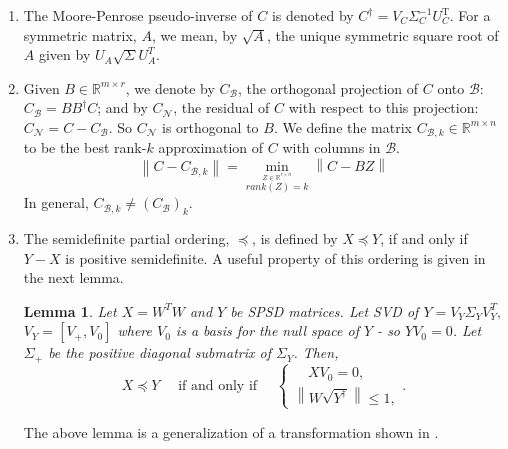 \documentclass[11pt]{article}
\newtheorem{lemma}[theorem]{Lemma}
\renewcommand{\math}[1]{$#1$}
\def\reals{\mathbb{R}}
\newcommand{\norm}[1]{\left\|#1\right\|}
\newcommand{\Leq}{\preceq}
\newcommand{\B}{\mathcal{B}}
\newcommand{\N}{\mathcal{N}}
\begin{document}
\begin{enumerate}
\item The Moore-Penrose pseudo-inverse of $C$ is denoted by $C^{\dagger} = V_C\Sigma_C^{-1}U_C^{\text{T}}$. For a symmetric matrix, $A$, we mean, by $\sqrt{A}$, the unique symmetric square root of $A$ given by $U_A \sqrt{\Sigma} U_A ^T$. 

\item Given $B \in \reals^{m \times r}$, we denote by $C_{\B}$, the orthogonal projection of $C$ onto $\B$: $C_{\B} = BB^{\dagger}C$; and by $C_{\N}$, the residual of $C$ with respect to this projection: $C_{\N} = C - C_{\B}$. So $C_{\N}$ is orthogonal to $B$. 
We define the matrix $C_{\B,k} \in \reals^{m \times n}$ to be the best rank-$k$ approximation of ${C}$ with columns in $\B$. 
\[\norm{C - C_{\B,k}} = \min_{\stackrel{Z \in \reals^{r \times n}}{rank(Z) = k}} \norm{C - BZ}\]
In general, $C_{\B,k} \neq (C_{\B})_k$. 

\item The semidefinite partial ordering, $\Leq$, is defined by $X \Leq Y$, if and only if $Y - X$ is positive semidefinite. 
A useful property of this ordering is given in the next lemma.
\begin{lemma}\label{basic lemma}
Let $X = W^TW$ and  $Y$ be SPSD matrices. Let SVD of $Y = V_Y\Sigma_Y V_Y^T,$ $V_Y = [V_+, V_0]$ where $V_0$ is a basis for the null space of 
$Y$ - so \math{YV_0=0}. Let $\Sigma_+$ be the positive diagonal submatrix of $\Sigma_Y$. Then, 
\[X \Leq Y \quad \text{  if and only if } \quad
\begin{cases}
\quad XV_0 = 0, \\[3pt]
\norm{W \sqrt{Y^{\dagger}} } \leq 1,
\end{cases}.
\]
\end{lemma}
\noindent The above lemma is a generalization of a transformation shown in \cite{SR}.
\end{enumerate}
\end{document}
